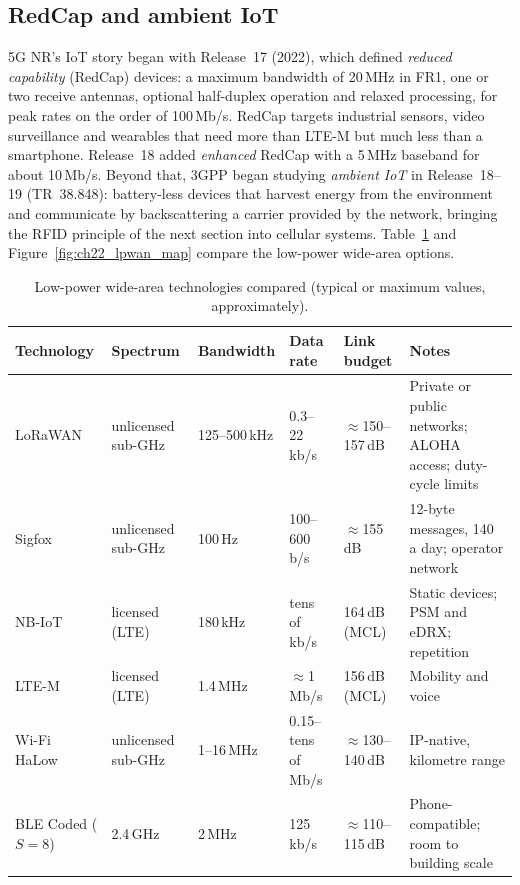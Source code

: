 
\subsection{RedCap and ambient IoT}

5G NR's IoT story began with Release~17 (2022), which defined \emph{reduced capability} (RedCap)
devices: a maximum bandwidth of 20\,MHz in FR1, one or two receive antennas, optional half-duplex
operation and relaxed processing, for peak rates on the order of 100\,Mb/s. RedCap targets industrial
sensors, video surveillance and wearables that need more than LTE-M but much less than a smartphone.
Release~18 added \emph{enhanced} RedCap with a 5\,MHz baseband for about 10\,Mb/s. Beyond that, 3GPP
began studying \emph{ambient IoT} in Release~18--19 (TR~38.848): battery-less devices that harvest
energy from the environment and communicate by backscattering a carrier provided by the network,
bringing the RFID principle of the next section into cellular systems. Table~\ref{tab:ch22:lpwan} and
Figure~\ref{fig:ch22_lpwan_map} compare the low-power wide-area options.

\begin{table}[htbp]\centering\footnotesize
\caption{Low-power wide-area technologies compared (typical or maximum values, approximately).}
\label{tab:ch22:lpwan}
\begin{tabularx}{\linewidth}{@{}l l l l l X@{}}
\toprule
Technology & Spectrum & Bandwidth & Data rate & Link budget & Notes\\
\midrule
LoRaWAN & unlicensed sub-GHz & 125--500\,kHz & 0.3--22\,kb/s & $\approx$150--157\,dB & Private or public networks; ALOHA access; duty-cycle limits\\
Sigfox & unlicensed sub-GHz & 100\,Hz & 100--600\,b/s & $\approx$155\,dB & 12-byte messages, 140 a day; operator network\\
NB-IoT & licensed (LTE) & 180\,kHz & tens of kb/s & 164\,dB (MCL) & Static devices; PSM and eDRX; repetition\\
LTE-M & licensed (LTE) & 1.4\,MHz & $\approx$1\,Mb/s & 156\,dB (MCL) & Mobility and voice\\
Wi-Fi HaLow & unlicensed sub-GHz & 1--16\,MHz & 0.15--tens of Mb/s & $\approx$130--140\,dB & IP-native, kilometre range\\
BLE Coded ($S=8$) & 2.4\,GHz & 2\,MHz & 125\,kb/s & $\approx$110--115\,dB & Phone-compatible; room to building scale\\
\bottomrule
\end{tabularx}
\end{table}

